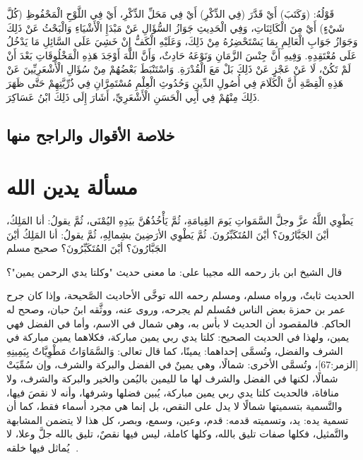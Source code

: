 قَوْلُهُ: (وَكَتَبَ) أَيْ قَدَّرَ (فِي الذِّكْرِ) أَيْ فِي مَحَلِّ الذِّكْرِ، أَيْ فِي اللَّوْحِ الْمَحْفُوظِ (كُلَّ شَيْءٍ) أَيْ مِنَ الْكَائِنَاتِ، وَفِي الْحَدِيثِ جَوَازُ السُّؤَالِ عَنْ مَبْدَإِ الْأَشْيَاءِ وَالْبَحْثُ عَنْ ذَلِكَ وَجَوَازُ جَوَابِ الْعَالِمِ بِمَا يَسْتَحْضِرُهُ مِنْ ذَلِكَ، وَعَلَيْهِ الْكَفُّ إِنْ خَشِيَ عَلَى السَّائِلِ مَا يَدْخُلُ عَلَى مُعْتَقِدِهِ. وَفِيهِ أَنَّ جِنْسَ الزَّمَانِ وَنَوْعَهُ حَادِثٌ، وَأَنَّ اللَّهَ أَوْجَدَ هَذِهِ الْمَخْلُوقَاتِ بَعْدَ أَنْ لَمْ تَكُنْ، لَا عَنْ عَجْزٍ عَنْ ذَلِكَ بَلْ مَعَ الْقُدْرَةِ. وَاسْتَنْبَطَ بَعْضُهُمْ مِنْ سُؤَالِ الْأَشْعَرِيِّينَ عَنْ هَذِهِ الْقِصَّةِ أَنَّ الْكَلَامَ فِي أُصُولِ الدِّينِ وَحُدُوثِ الْعِلْمِ مُسْتَمِرَّانِ فِي ذُرِّيَّتِهِمْ حَتَّى ظَهَرَ ذَلِكَ مِنْهُمْ فِي أَبِي الْحَسَنِ الْأَشْعَرِيِّ، أَشَارَ إِلَى ذَلِكَ ابْنُ عَسَاكِرَ.


\subsection{خلاصة الأقوال والراجح منها}

\section{مسألة يدين الله}

يَطْوِي اللَّهُ عزَّ وجلَّ السَّمَواتِ يَومَ القِيامَةِ، ثُمَّ يَأْخُذُهُنَّ بيَدِهِ اليُمْنَى، ثُمَّ يقولُ: أنا المَلِكُ، أيْنَ الجَبَّارُونَ؟ أيْنَ المُتَكَبِّرُونَ. ثُمَّ يَطْوِي الأرَضِينَ بشِمالِهِ، ثُمَّ يقولُ: أنا المَلِكُ أيْنَ الجَبَّارُونَ؟ أيْنَ المُتَكَبِّرُونَ؟
صحيح مسلم

قال الشيخ ابن باز رحمه الله مجيبا على: ما معنى حديث "وكلتا يدي الرحمن يمين"؟

الحديث ثابتٌ، ورواه مسلم، ومسلم رحمه الله توخَّى الأحاديث الصَّحيحة، وإذا كان جرح عمر بن حمزة بعض الناس فمُسلم لم يجرحه، وروى عنه، ووثَّقه ابنُ حبان، وصحح له الحاكم.
فالمقصود أن الحديث لا بأس به، وهي شمال في الاسم، وأما في الفضل فهي يمين، ولهذا في الحديث الصحيح: كلتا يدي ربي يمين مباركة، فكلاهما يمين مباركة في الشرف والفضل، وتُسمَّى إحداهما: يمينًا، كما قال تعالى: وَالسَّمَاوَاتُ مَطْوِيَّاتٌ بِيَمِينِهِ [الزمر:67]، وتُسمَّى الأخرى: شمالًا، وهي يمينٌ في الفضل والبركة والشرف، وإن سُمِّيَتْ شمالًا، لكنها في الفضل والشرف لها ما لليمين باليُمن والخير والبركة والشرف، ولا منافاة، فالحديث كلتا يدي ربي يمين مباركة، يُبين فضلها وشرفها، وأنه لا نقصَ فيها، والتَّسمية بتسميتها شمالًا لا يدل على النقص، بل إنما هي مجرد أسماء فقط، كما أن تسمية يده: يد، وتسميته قدمه: قدم، وعين، وسمع، وبصر، كل هذا لا يتضمن المشابهة والتَّمثيل، فكلها صفات تليق بالله، وكلها كاملة، ليس فيها نقصٌ، تليق بالله جلَّ وعلا، لا يُماثل فيها خلقه .

